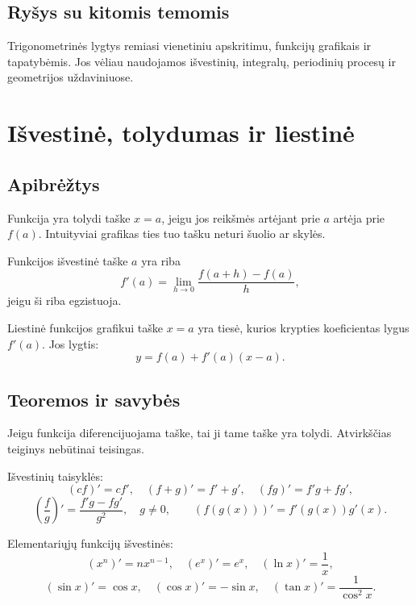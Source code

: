 \subsection{Ryšys su kitomis temomis}
Trigonometrinės lygtys remiasi vienetiniu apskritimu, funkcijų grafikais ir tapatybėmis. Jos vėliau naudojamos išvestinių, integralų, periodinių procesų ir geometrijos uždaviniuose.

\section{Išvestinė, tolydumas ir liestinė}\label{sec:isvestine-tolydumas-ir-liestine}

\subsection{Apibrėžtys}
\begin{apibreztis}
Funkcija yra tolydi taške \(x=a\), jeigu jos reikšmės artėjant prie \(a\) artėja prie \(f(a)\). Intuityviai grafikas ties tuo tašku neturi šuolio ar skylės.
\end{apibreztis}
\begin{apibreztis}
Funkcijos išvestinė taške \(a\) yra riba
\[
f'(a)=\lim_{h\to0}\frac{f(a+h)-f(a)}{h},
\]
jeigu ši riba egzistuoja.
\end{apibreztis}
\begin{apibreztis}
Liestinė funkcijos grafikui taške \(x=a\) yra tiesė, kurios krypties koeficientas lygus \(f'(a)\). Jos lygtis:
\[
y=f(a)+f'(a)(x-a).
\]
\end{apibreztis}

\subsection{Teoremos ir savybės}
\begin{savybe}
Jeigu funkcija diferencijuojama taške, tai ji tame taške yra tolydi. Atvirkščias teiginys nebūtinai teisingas.
\end{savybe}
\begin{savybe}
Išvestinių taisyklės:
\[
(cf)'=cf',\quad (f+g)'=f'+g',\quad (fg)'=f'g+fg',
\]
\[
\left(\frac{f}{g}\right)'=\frac{f'g-fg'}{g^2},\quad g\ne0,\qquad
(f(g(x)))'=f'(g(x))g'(x).
\]
\end{savybe}
\begin{savybe}
Elementariųjų funkcijų išvestinės:
\[
(x^n)'=nx^{n-1},\quad (e^x)'=e^x,\quad (\ln x)'=\frac1x,
\]
\[
(\sin x)'=\cos x,\quad (\cos x)'=-\sin x,\quad (\tan x)'=\frac{1}{\cos^2x}.
\]
\end{savybe}

